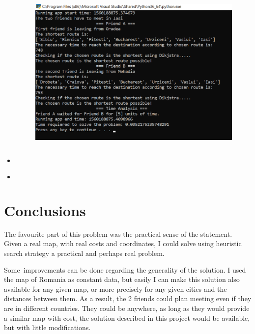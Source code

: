 \documentclass[12pt]{article}
\begin{document}
\begin{itemize}

	\item \par




\begin{figure}[H]
	\begin{Center}
		\includegraphics[width=5.59in,height=3.86in]{./media/image17.png}
	\end{Center}
\end{figure}



	\item \par


\end{itemize}\section*{Conclusions}
\begin{justify}
\tab The favourite part of this problem was the practical sense of the statement. Given a real map, with real costs and coordinates, I could solve using heuristic search strategy a practical and perhaps real problem.
\end{justify}\par

\begin{justify}
\tab Some\ improvements can be done regarding the generality of the solution. I used the map of Romania as constant data, but easily I can make this solution also available for any given map, or more precisely for any given cities and the distances between them. As a result, the 2 friends could plan meeting even if they are in different countries. They could be anywhere, as long as they would provide a similar map with cost, the solution described in this project would be available, but with little modifications.  
\end{justify}\par
\end{document}

